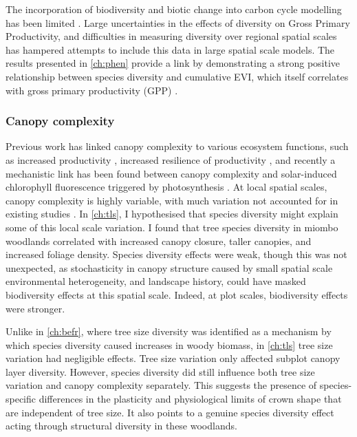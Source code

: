 \begin{refsection}
The incorporation of biodiversity and biotic change into carbon cycle modelling has been limited \citep{Ahlstrom2015, Bodegom2011}. Large uncertainties in the effects of diversity on Gross Primary Productivity, and difficulties in measuring diversity over regional spatial scales has hampered attempts to include this data in large spatial scale models. The results presented in \autoref{ch:phen} provide a link by demonstrating a strong positive relationship between species diversity and cumulative EVI, which itself correlates with gross primary productivity (GPP) \citep{Sjostrom2011}.

\subsubsection{Canopy complexity}
\label{discussion:sssec:canopy}

Previous work has linked canopy complexity to various ecosystem functions, such as increased productivity \citep{Gough2019, Hardiman2011}, increased resilience of productivity \citep{Pretzsch2014}, and recently a mechanistic link has been found between canopy complexity and solar-induced chlorophyll fluorescence triggered by photosynthesis \citep{Regaieg2021}. At local spatial scales, canopy complexity is highly variable, with much variation not accounted for in existing studies \citep{Guan2014}. In \autoref{ch:tls}, I hypothesised that species diversity might explain some of this local scale variation. I found that tree species diversity in miombo woodlands correlated with increased canopy closure, taller canopies, and increased foliage density. Species diversity effects were weak, though this was not unexpected, as stochasticity in canopy structure caused by small spatial scale environmental heterogeneity, and landscape history, could have masked biodiversity effects at this spatial scale. Indeed, at plot scales, biodiversity effects were stronger.

Unlike in \autoref{ch:befr}, where tree size diversity was identified as a mechanism by which species diversity caused increases in woody biomass, in \autoref{ch:tls} tree size variation had negligible effects. Tree size variation only affected subplot canopy layer diversity. However, species diversity did still influence both tree size variation and canopy complexity separately. This suggests the presence of species-specific differences in the plasticity and physiological limits of crown shape that are independent of tree size. It also points to a genuine species diversity effect acting through structural diversity in these woodlands.


\end{refsection}
